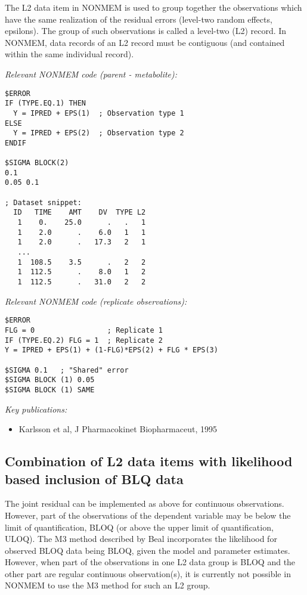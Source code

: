 \documentclass[a4paper,11pt]{article}
\begin{document}
The L2 data item in NONMEM is used to group together the observations
which have the same realization of the residual errors (level-two
random effects, epsilons). The group of such observations is called a
level-two (L2) record. In NONMEM, data records of an L2 record must be
contiguous (and contained within the
same individual record).

\noindent \emph{Relevant NONMEM code (parent - metabolite):}
\begin{lstlisting}
$ERROR
IF (TYPE.EQ.1) THEN
  Y = IPRED + EPS(1)  ; Observation type 1
ELSE
  Y = IPRED + EPS(2)  ; Observation type 2
ENDIF

$SIGMA BLOCK(2)
0.1
0.05 0.1

; Dataset snippet:
  ID   TIME    AMT    DV  TYPE L2
   1    0.    25.0      .   .   1
   1    2.0      .    6.0   1   1
   1    2.0      .   17.3   2   1
   ...
   1  108.5    3.5      .   2   2
   1  112.5      .    8.0   1   2
   1  112.5      .   31.0   2   2
\end{lstlisting}

\vspace{10pt}

\noindent \emph{Relevant NONMEM code (replicate observations):}
\begin{lstlisting}
$ERROR
FLG = 0                 ; Replicate 1
IF (TYPE.EQ.2) FLG = 1  ; Replicate 2
Y = IPRED + EPS(1) + (1-FLG)*EPS(2) + FLG * EPS(3)

$SIGMA 0.1   ; "Shared" error
$SIGMA BLOCK (1) 0.05
$SIGMA BLOCK (1) SAME

\end{lstlisting}

\noindent \emph{Key publications:}
\begin{itemize}
\item Karlsson et al, J Pharmacokinet Biopharmaceut, 1995
\end{itemize}

\subsection{Combination of L2 data items with likelihood based
  inclusion of BLQ data}
The joint residual can be implemented as above for continuous
observations. However, part of the observations of the dependent
variable may be below the limit of quantification, BLOQ (or above the
upper limit of quantification, ULOQ). The M3 method described by Beal
incorporates the likelihood for observed BLOQ data being BLOQ, given
the model and parameter estimates. However, when part of the
observations in one L2 data group is BLOQ and the other part are
regular continuous observation(s), it is currently not possible in NONMEM to use
the M3 method for such an L2 group.
\end{document}
